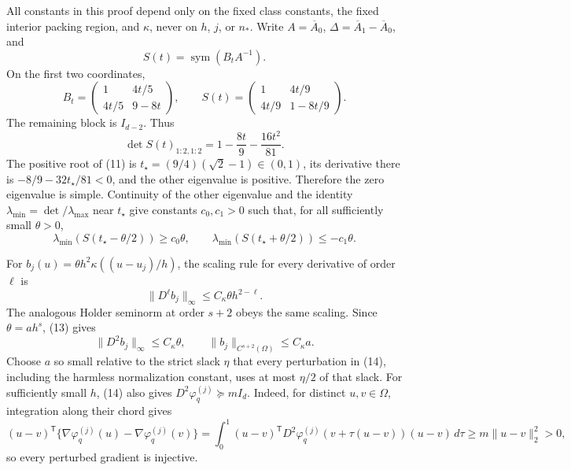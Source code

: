 All constants in this proof depend only on the fixed class constants, the fixed interior packing region, and \(\kappa\), never on \(h\), \(j\), or \(n_\ast\).  Write \(A=\overline A_0\), \(\Delta=\overline A_1-\overline A_0\), and
\[
 S(t)=\operatorname{sym}(B_tA^{-1}).
\]
On the first two coordinates,
\[
 B_t=
 \begin{pmatrix}1&4t/5\\4t/5&9-8t\end{pmatrix},
 \qquad
 S(t)=
 \begin{pmatrix}1&4t/9\\4t/9&1-8t/9\end{pmatrix}.
 \tag{10}
\]
The remaining block is \(I_{d-2}\).  Thus
\[
 \det S(t)_{1:2,1:2}=1-\frac{8t}{9}-\frac{16t^2}{81}.
 \tag{11}
\]
The positive root of (11) is \(t_\star=(9/4)(\sqrt2-1)\in(0,1)\), its derivative there is \(-8/9-32t_\star/81<0\), and the other eigenvalue is positive.  Therefore the zero eigenvalue is simple.  Continuity of the other eigenvalue and the identity \(\lambda_{\min}=\det/\lambda_{\max}\) near \(t_\star\) give constants \(c_0,c_1>0\) such that, for all sufficiently small \(\theta>0\),
\[
 \lambda_{\min}(S(t_\star-\theta/2))\ge c_0\theta,
 \qquad
 \lambda_{\min}(S(t_\star+\theta/2))\le-c_1\theta.
 \tag{12}
\]

For \(b_j(u)=\theta h^2\kappa((u-u_j)/h)\), the scaling rule for every derivative of order \(\ell\) is
\[
 \lVert D^\ell b_j\rVert_\infty
 \le C_\kappa\theta h^{2-\ell}.
 \tag{13}
\]
The analogous Holder seminorm at order \(s+2\) obeys the same scaling.  Since \(\theta=ah^s\), (13) gives
\[
 \lVert D^2b_j\rVert_\infty\le C_\kappa\theta,
 \qquad
 \lVert b_j\rVert_{C^{s+2}(\Omega)}\le C_\kappa a.
 \tag{14}
\]
Choose \(a\) so small relative to the strict slack \(\eta\) that every perturbation in (14), including the harmless normalization constant, uses at most \(\eta/2\) of that slack.  For sufficiently small \(h\), (14) also gives \(D^2\varphi_q^{(j)}\succeq mI_d\).  Indeed, for distinct \(u,v\in\Omega\), integration along their chord gives
\[
 (u-v)^{\mathsf T}\{\nabla\varphi_q^{(j)}(u)-\nabla\varphi_q^{(j)}(v)\}
 =\int_0^1 (u-v)^{\mathsf T}D^2\varphi_q^{(j)}(v+\tau(u-v))(u-v)\,d\tau
 \ge m\lVert u-v\rVert_2^2>0,
\]
so every perturbed gradient is injective.

